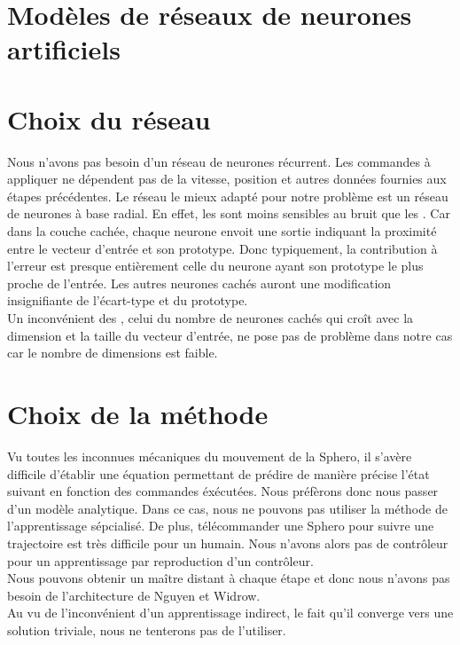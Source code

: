 \documentclass[12pt,a4paper,oneside, titlepage]{article}
\begin{document}


\tableofcontents
\newpage


\section{Modèles de réseaux de neurones artificiels}










\section{Choix du réseau}
Nous n'avons pas besoin d'un réseau de neurones récurrent.
Les commandes à appliquer ne dépendent pas de la vitesse, position et autres données fournies aux étapes précédentes.
Le réseau le mieux adapté pour notre problème est un réseau de neurones à base radial.
En effet, les \rbf sont moins sensibles au bruit que les \mlp \cite{adversarial,Gauthier}.%
Car dans la couche cachée, chaque neurone envoit une sortie indiquant la proximité entre le vecteur d'entrée et son prototype.
Donc typiquement, la contribution à l'erreur est presque entièrement celle du neurone ayant son prototype le plus proche de l'entrée.
Les autres neurones cachés auront une modification insignifiante de l'écart-type et du prototype.\\

Un inconvénient des \rbf, celui du nombre de neurones cachés qui croît avec la dimension et la taille du vecteur d'entrée, ne pose pas de problème dans notre cas car le nombre de dimensions est faible.



\section{Choix de la méthode}
Vu toutes les inconnues mécaniques du mouvement de la Sphero, il s'avère difficile d'établir une équation permettant de prédire de manière précise l'état suivant en fonction des commandes éxécutées.
Nous préfèrons donc nous passer d'un modèle analytique.
Dans ce cas, nous ne pouvons pas utiliser la méthode de l'apprentissage sépcialisé.
De plus, télécommander une Sphero pour suivre une trajectoire est très difficile pour un humain.
Nous n'avons alors pas de contrôleur pour un apprentissage par reproduction d'un contrôleur.\\
Nous pouvons obtenir un maître distant à chaque étape et donc nous n'avons pas besoin de l'architecture de Nguyen et Widrow.\\
Au vu de l'inconvénient d'un apprentissage indirect, le fait qu'il converge vers une solution triviale, nous ne tenterons pas de l'utiliser.\\
\end{document}
